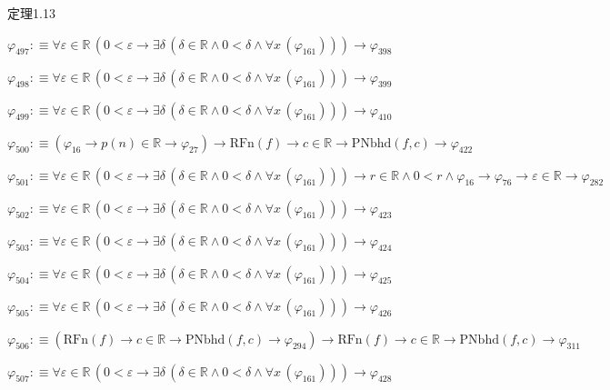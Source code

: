 \begin{fullproof}{定理1.13}
\begin{abbrevlist}
\item $\varphi_{497} :\equiv \forall \varepsilon \in \mathbb{R}\,(0 < \varepsilon \to \exists \delta\,(\delta \in \mathbb{R} \land 0 < \delta \land \forall x\,(\varphi_{161}))) \to \varphi_{398}$
\item $\varphi_{498} :\equiv \forall \varepsilon \in \mathbb{R}\,(0 < \varepsilon \to \exists \delta\,(\delta \in \mathbb{R} \land 0 < \delta \land \forall x\,(\varphi_{161}))) \to \varphi_{399}$
\item $\varphi_{499} :\equiv \forall \varepsilon \in \mathbb{R}\,(0 < \varepsilon \to \exists \delta\,(\delta \in \mathbb{R} \land 0 < \delta \land \forall x\,(\varphi_{161}))) \to \varphi_{410}$
\item $\varphi_{500} :\equiv (\varphi_{16} \to p(n) \in \mathbb{R} \to \varphi_{27}) \to \mathrm{RFn}(f) \to c \in \mathbb{R} \to \mathrm{PNbhd}(f,c) \to \varphi_{422}$
\item $\varphi_{501} :\equiv \forall \varepsilon \in \mathbb{R}\,(0 < \varepsilon \to \exists \delta\,(\delta \in \mathbb{R} \land 0 < \delta \land \forall x\,(\varphi_{161}))) \to r \in \mathbb{R} \land 0 < r \land \varphi_{16} \to \varphi_{76} \to \varepsilon \in \mathbb{R} \to \varphi_{282}$
\item $\varphi_{502} :\equiv \forall \varepsilon \in \mathbb{R}\,(0 < \varepsilon \to \exists \delta\,(\delta \in \mathbb{R} \land 0 < \delta \land \forall x\,(\varphi_{161}))) \to \varphi_{423}$
\item $\varphi_{503} :\equiv \forall \varepsilon \in \mathbb{R}\,(0 < \varepsilon \to \exists \delta\,(\delta \in \mathbb{R} \land 0 < \delta \land \forall x\,(\varphi_{161}))) \to \varphi_{424}$
\item $\varphi_{504} :\equiv \forall \varepsilon \in \mathbb{R}\,(0 < \varepsilon \to \exists \delta\,(\delta \in \mathbb{R} \land 0 < \delta \land \forall x\,(\varphi_{161}))) \to \varphi_{425}$
\item $\varphi_{505} :\equiv \forall \varepsilon \in \mathbb{R}\,(0 < \varepsilon \to \exists \delta\,(\delta \in \mathbb{R} \land 0 < \delta \land \forall x\,(\varphi_{161}))) \to \varphi_{426}$
\item $\varphi_{506} :\equiv (\mathrm{RFn}(f) \to c \in \mathbb{R} \to \mathrm{PNbhd}(f,c) \to \varphi_{294}) \to \mathrm{RFn}(f) \to c \in \mathbb{R} \to \mathrm{PNbhd}(f,c) \to \varphi_{311}$
\item $\varphi_{507} :\equiv \forall \varepsilon \in \mathbb{R}\,(0 < \varepsilon \to \exists \delta\,(\delta \in \mathbb{R} \land 0 < \delta \land \forall x\,(\varphi_{161}))) \to \varphi_{428}$

\end{abbrevlist}
\end{fullproof}
